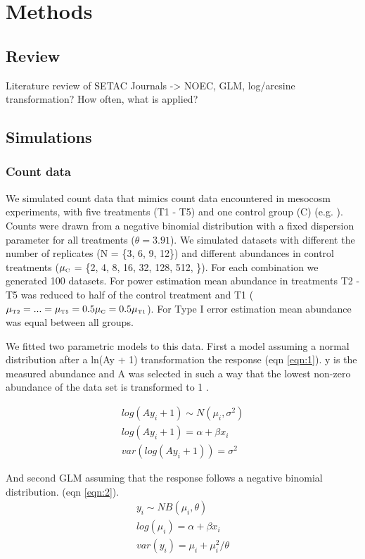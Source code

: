 \documentclass{scrartcl}\usepackage[]{graphicx}\usepackage[]{color}
\begin{document}
\section{Methods}
\subsection{Review}
Literature review of SETAC Journals -> NOEC, GLM, log/arcsine transformation? How often, what is applied?

\subsection{Simulations}
\subsubsection{Count data}
We simulated count data that mimics count data encountered in mesocosm experiments, with five treatments (T1 - T5) and one control group (C) (e.g. \citep{brock_minimum_2014}).
Counts were drawn from a negative binomial distribution with a fixed dispersion parameter for all treatments ($\theta = 3.91$).
We simulated datasets with different the number of replicates (N = \{3, 6, 9, 12\}) and different abundances in control treatments ($\mu_\text{\tiny C}$ = \{2, 4, 8, 16, 32, 128, 512, \}). 
For each combination we generated 100 datasets.
For power estimation mean abundance in treatments T2 - T5 was reduced to half of the control treatment and T1 ($\mu_\text{\tiny T2} = ... = \mu_\text{\tiny T5} = 0.5 \mu_\text{\tiny C} = 0.5 \mu_\text{\tiny T1} $).
For Type I error estimation mean abundance was equal between all groups.

We fitted two parametric models to this data.
First a model assuming a normal distribution after a ln(Ay + 1) transformation the response (eqn \ref{eqn:1}).
y is the measured abundance and A was selected in such a way that the lowest non-zero abundance of the data set is transformed to 1 \citep{van_den_brink_impact_2000}.

\begin{align}
  log(Ay_i + 1) \sim N(\mu_i, \sigma^2) \nonumber \\
  log(Ay_i + 1) = \alpha + \beta x_i \label{eqn:1} \\
  var(log(Ay_i + 1)) = \sigma^2 \nonumber
\end{align}

And second GLM assuming that the response follows a negative binomial distribution. (eqn \ref{eqn:2}).
\begin{align}
  y_i \sim NB(\mu_i, \theta)  \nonumber \\
  log(\mu_i) = \alpha + \beta x_i   \label{eqn:2} \\
  var(y_i) = \mu_i + \mu_i^2 / \theta  \nonumber
\end{align}
\end{document}
